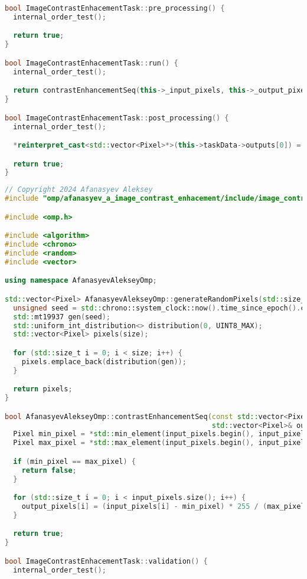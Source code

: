 \documentclass{report}
\begin{document}
\begin{lstlisting}[language=C++,caption=Последовательная версия]
bool ImageContrastEnhacementTask::pre_processing() {
  internal_order_test();

  return true;
}

bool ImageContrastEnhacementTask::run() {
  internal_order_test();

  return contrastEnhancementSeq(this->_input_pixels, this->_output_pixels);
}

bool ImageContrastEnhacementTask::post_processing() {
  internal_order_test();

  *reinterpret_cast<std::vector<Pixel>*>(this->taskData->outputs[0]) = this->_output_pixels;

  return true;
}
\end{lstlisting}

\newpage

\begin{lstlisting}[language=C++,caption=OpenMP версия]
// Copyright 2024 Afanasyev Aleksey
#include "omp/afanasyev_a_image_contrast_enhacement/include/image_contrast_enhacement_task.hpp"

#include <omp.h>

#include <algorithm>
#include <chrono>
#include <random>
#include <vector>

using namespace AfanasyevAlekseyOmp;

std::vector<Pixel> AfanasyevAlekseyOmp::generateRandomPixels(std::size_t size) {
  unsigned seed = std::chrono::system_clock::now().time_since_epoch().count();
  std::mt19937 gen(seed);
  std::uniform_int_distribution<> distribution(0, UINT8_MAX);
  std::vector<Pixel> pixels(size);

  for (std::size_t i = 0; i < size; i++) {
    pixels.emplace_back(distribution(gen));
  }

  return pixels;
}

bool AfanasyevAlekseyOmp::contrastEnhancementSeq(const std::vector<Pixel>& input_pixels,
                                                 std::vector<Pixel>& output_pixels) {
  Pixel min_pixel = *std::min_element(input_pixels.begin(), input_pixels.end());
  Pixel max_pixel = *std::max_element(input_pixels.begin(), input_pixels.end());

  if (min_pixel == max_pixel) {
    return false;
  }

  for (std::size_t i = 0; i < input_pixels.size(); i++) {
    output_pixels[i] = (input_pixels[i] - min_pixel) * 255 / (max_pixel - min_pixel);
  }

  return true;
}

bool ImageContrastEnhacementTask::validation() {
  internal_order_test();


\end{lstlisting}
\end{document}

